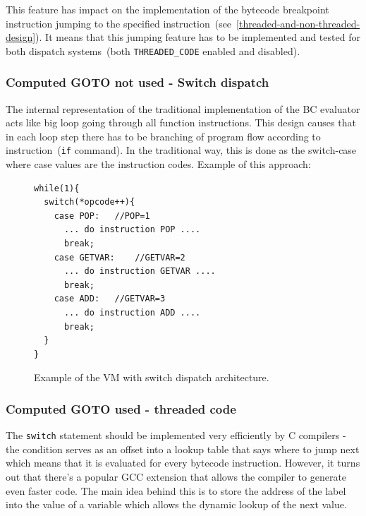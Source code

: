 \documentclass[thesis=M,english]{FITthesis}[2018/10/20]
\newcommand{\code}[1]{\texttt{#1}}
\begin{document}
This feature has impact on the implementation of the bytecode breakpoint instruction jumping to the specified instruction~(see~\ref{threaded-and-non-threaded-design}). It means that this jumping feature has to be implemented and tested for both dispatch systems~(both \code{THREADED{\_}CODE} enabled and disabled).

\subsubsection{Computed GOTO not used - Switch dispatch}\label{computed-goto-not-used}

The internal representation of the traditional implementation of the BC evaluator acts like big loop going through all function instructions. This design causes that in each loop step there has to be branching of program flow according to instruction~(\code{if} command). In the traditional way, this is done as the switch-case where case values are the instruction codes. Example of this approach:

\begin{figure}[H]
\begin{lstlisting}
while(1){
  switch(*opcode++){
    case POP:	//POP=1
      ... do instruction POP ....
      break;
    case GETVAR:	//GETVAR=2
      ... do instruction GETVAR ....
      break;
    case ADD:	//GETVAR=3
      ... do instruction ADD ....
      break;
  }
}
\end{lstlisting}
\caption{\label{fig:goto-not-used} Example of the VM with switch dispatch architecture.}
\end{figure}

\subsubsection{Computed GOTO used - threaded code}\label{computed-goto-used}

The \code{switch} statement should be implemented very efficiently by C compilers - the condition serves as an offset into a lookup table that says where to jump next which means that it is evaluated for every bytecode instruction. However, it turns out that there's a popular GCC extension that allows the compiler to generate even faster code. The main idea behind this is to store the address of the label into the value of a variable which allows the dynamic lookup of the next value.
\end{document}
